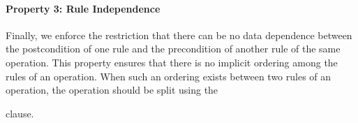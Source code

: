 %
%

\paragraph*{Property 3: Rule Independence}
Finally, we enforce the restriction that there can be no data dependence between
the postcondition of one rule and the precondition of another rule of the same
operation. This property ensures that there is no implicit ordering among the
rules of an operation. When such an ordering exists between two rules of an
operation, the operation should be split using the \subject{next} clause.


